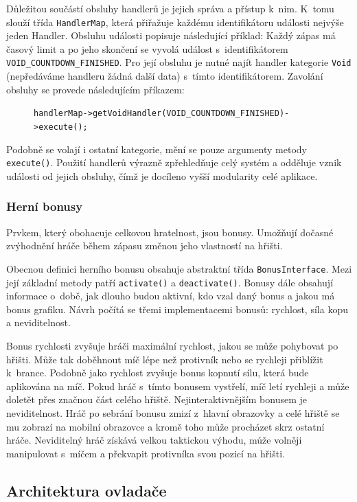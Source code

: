 \documentclass[thesis=B,czech,hidelinks]{FITthesis}[2012/06/26] %
\newcommand{\code}[1]{\texttt{#1}}
\begin{document}
Důležitou součástí obsluhy handlerů je jejich správa a přístup k~nim. K~tomu slouží třída \code{HandlerMap}, která přiřažuje každému identifikátoru události nejvýše jeden Handler. Obsluhu události popisuje následující příklad: Každý zápas má časový limit a po jeho skončení se vyvolá událost s~identifikátorem \code{VOID\_COUNTDOWN\_FINISHED}. Pro její obsluhu je nutné najít handler kategorie \code{Void} (nepředáváme handleru žádná další data) s~tímto identifikátorem. Zavolání obsluhy se provede následujícím příkazem: 

\begin{figure}[h!]
	\code{handlerMap->getVoidHandler(VOID\_COUNTDOWN\_FINISHED)->execute();}
\end{figure}

Podobně se volají i ostatní kategorie, mění se pouze argumenty metody \code{execute()}. Použití handlerů výrazně zpřehledňuje celý systém a odděluje vznik události od jejich obsluhy, čímž je docíleno vyšší modularity celé aplikace.

\subsubsection{Herní bonusy}

Prvkem, který obohacuje celkovou hratelnost, jsou bonusy. Umožňují dočasné zvýhodnění hráče během zápasu změnou jeho vlastností na hřišti. 

Obecnou definici herního bonusu obsahuje abstraktní třída \code{BonusInterface}. Mezi její základní metody patří \code{activate()} a \code{deactivate()}. Bonusy dále obsahují informace o~době, jak dlouho budou aktivní, kdo vzal daný bonus a jakou má bonus grafiku. Návrh počítá se třemi implementacemi bonusů: rychlost, síla kopu a neviditelnost.

Bonus rychlosti zvyšuje hráči maximální rychlost, jakou se může pohybovat po hřišti. Může tak doběhnout míč lépe než protivník nebo se rychleji přiblížit k~brance.
Podobně jako rychlost zvyšuje bonus kopnutí sílu, která bude aplikována na míč. Pokud hráč s~tímto bonusem vystřelí, míč letí rychleji a může doletět přes značnou část celého hřiště.
Nejinteraktivnějším bonusem je neviditelnost. Hráč po sebrání bonusu zmizí z~hlavní obrazovky a celé hřiště se mu zobrazí na mobilní obrazovce a kromě toho může procházet skrz ostatní hráče. Neviditelný hráč získává velkou taktickou výhodu, může volněji manipulovat s~míčem a překvapit protivníka svou pozicí na hřišti.

\subsection{Architektura ovladače}
\end{document}
